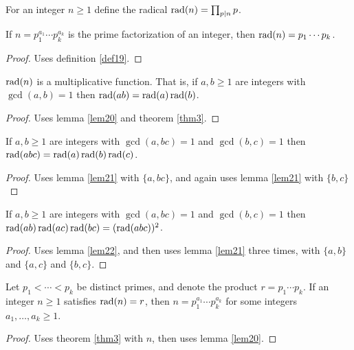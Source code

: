 \begin{definition}[Radical] \label{def19} \leanok
For an integer $n\ge1$ define the radical $\operatorname{rad}(n)=\prod_{p\mid n}p$.
\end{definition}

\begin{lemma} \label{lem20} 
If $n = p_1^{a_1}\cdots p_k^{a_k}$ is the prime factorization of an integer, then $\operatorname{rad}(n)=p_1\cdots p_k$.
\end{lemma}
\begin{proof}\leanok
{}
Uses definition \ref{def19}.
\end{proof}

\begin{lemma} \label{lem21} 
$\operatorname{rad}(n)$ is a multiplicative function. That is, if $a,b\ge1$ are integers with $\gcd(a,b)=1$ then $\operatorname{rad}(ab) = \operatorname{rad}(a)\operatorname{rad}(b)$. 
\end{lemma}
\begin{proof}\leanok
{}
Uses lemma \ref{lem20} and theorem \ref{thm3}.
\end{proof}

\begin{lemma} \label{lem22} 
If $a,b\ge1$ are integers with $\gcd(a,bc)=1$ and $\gcd(b,c)=1$ then $\operatorname{rad}(abc) = \operatorname{rad}(a)\operatorname{rad}(b)\operatorname{rad}(c)$. 
\end{lemma}
\begin{proof}\leanok
{}
Uses lemma \ref{lem21} with $\{a,bc\}$, and again uses lemma \ref{lem21} with $\{b,c\}$
\end{proof}

\begin{lemma} \label{lem23} 
If $a,b\ge1$ are integers with $\gcd(a,bc)=1$ and $\gcd(b,c)=1$ then $\operatorname{rad}(ab) \operatorname{rad}(ac)\operatorname{rad}(bc) = (\operatorname{rad}(abc))^2$.
\end{lemma}
\begin{proof}\leanok
{}
Uses lemma \ref{lem22}, and then uses lemma \ref{lem21} three times, with $\{a,b\}$ and $\{a,c\}$ and $\{b,c\}$.
\end{proof}


\begin{lemma} \label{lem24} 
Let $p_1<\cdots<p_k$ be distinct primes, and denote the product $r = p_1 \cdots p_k$. If an integer $n\ge1$ satisfies $\operatorname{rad}(n)=r$, then $n = p_1^{a_1}\cdots p_k^{a_k}$ for some integers $a_1,\dots,a_k\ge 1$.
\end{lemma}
\begin{proof}\leanok
{}
Uses theorem \ref{thm3} with $n$, then uses lemma \ref{lem20}.
\end{proof}

